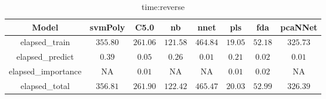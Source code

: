 \begin{table}[!ht]
	\centering
	\begin{tabular}{|c|c|c|c|c|c|c|c|}
		\hline
		Model & svmPoly & C5.0 & nb & nnet & pls & fda & pcaNNet \\ \hline
		elapsed_train & $355.80$ & $261.06$ & $121.58$ & $464.84$ & $19.05$ & $52.18$ & $325.73$ \\ \hline
		elapsed_predict & $0.39$ & $0.05$ & $0.26$ & $0.01$ & $0.21$ & $0.02$ & $0.01$ \\ \hline
		elapsed_importance & NA & $0.01$ & NA & NA & $0.01$ & $0.02$ & NA \\ \hline
		elapsed_total & $356.81$ & $261.90$ & $122.42$ & $465.47$ & $20.03$ & $52.99$ & $326.39$ \\ \hline
	\end{tabular}
	\caption{time:reverse}
	\label{tab:time:reverse}
\end{table}
